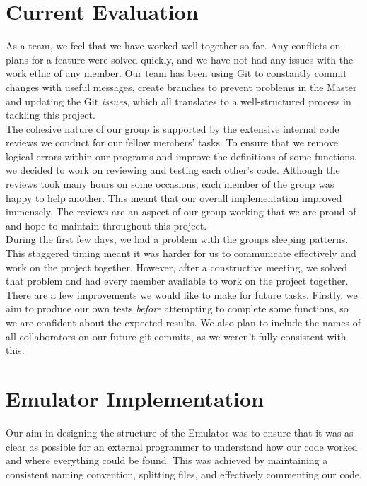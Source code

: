 \documentclass[10pt]{article}
\begin{document}
\section*{Current Evaluation}
As a team, we feel that we have worked well together so far. Any conflicts on plans for a feature were solved quickly, and we have not had any issues with the work ethic of any member. Our team has been using Git to constantly commit changes with useful messages, create branches to prevent problems in the Master and updating the Git \textsl{issues}, which all translates to a well-structured process in tackling this project.
\\

The cohesive nature of our group is supported by the extensive internal code reviews we conduct for our fellow members’ tasks. To ensure that we remove logical errors within our programs and improve the definitions of some functions, we decided to work on reviewing and testing each other’s code. Although the reviews took many hours on some occasions, each member of the group was happy to help another. This meant that our overall implementation improved immensely. The reviews are an aspect of our group working that we are proud of and hope to maintain throughout this project.
\\

During the first few days, we had a problem with the groups sleeping patterns. This staggered timing meant it was harder for us to communicate effectively and work on the project together. However, after a constructive meeting, we solved that problem and had every member available to work on the project together.
\\

There are a few improvements we would like to make for future tasks. Firstly, we aim to produce our own tests \textsl{before} attempting to complete some functions, so we are confident about the expected results. We also plan to include the names of all collaborators on our future git commits, as we weren't fully consistent with this.  

\section*{Emulator Implementation}
Our aim in designing the structure of the Emulator was to ensure that it was as clear as possible for an external programmer to understand how our code worked and where everything could be found. This was achieved by maintaining a consistent naming convention, splitting files, and effectively commenting our code.
\end{document}
